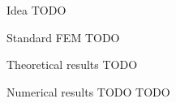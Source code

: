 \begin{frame}{Idea}
	TODO
\end{frame}

\begin{frame}{Standard FEM}
	TODO
\end{frame}

\begin{frame}{Theoretical results}
	TODO
\end{frame}

\begin{frame}[allowframebreaks]{Numerical results}
	TODO
	\newpage
	TODO
\end{frame}
